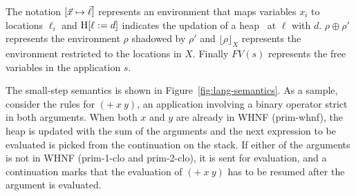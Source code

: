 \documentclass[9pt]{sigplanconf}
\def\myvec{\mathaccent"017E } %
\begin{document}
The notation  $[\myvec{x}   \mapsto  \myvec{\ell}]$   represents  an
environment that maps variables $x_i$
to locations $\ell_i$
and  $\mbox{H}[\ell :=  d]$
indicates the  updation of  a heap \heap\  at $\ell$ with  $d$.  $\rho
\oplus \rho'$  represents the  environment $\rho$ shadowed  by $\rho'$
and $\lfloor \rho \rfloor_X$  represents the environment restricted to
the locations in $X$. Finally $FV(s)$ represents the free variables in
the application $s$.

The small-step semantics  is shown in Figure~\ref{fig:lang-semantics}.
As  a sample,  consider  the  rules  for  $(+~x~y)$, an  application
involving a binary operator strict in both arguments.   When
both $x$  and $y$ are already  in WHNF ({\sc prim-whnf}),  the heap is
updated with the  sum of the arguments and  the next expression to be
evaluated is picked from the continuation on the stack. If either of the arguments is not in
WHNF  ({\sc  prim-1-clo}  and   {\sc  prim-2-clo}),  it  is  sent  for
evaluation, and a continuation  marks that the evaluation of $(+~x~y)$
has to be resumed after the argument is evaluated.
\end{document}
